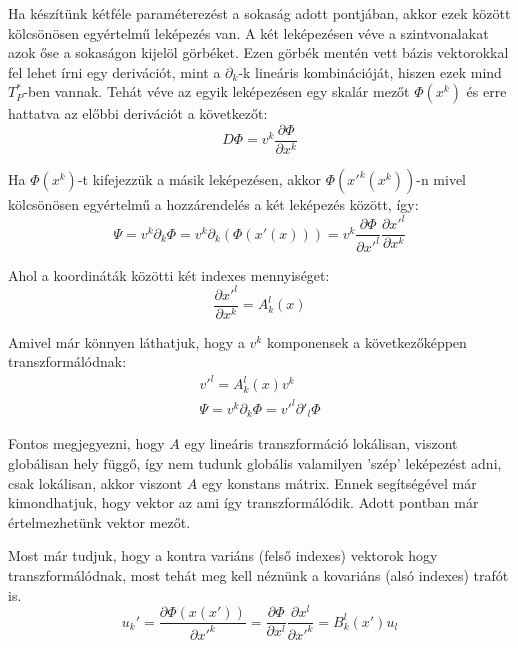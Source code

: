 \documentclass[a4paper, 12pt]{article}
\begin{document}
\par Ha készítünk kétféle paraméterezést a sokaság adott pontjában, akkor ezek között kölcsönösen egyértelmű leképezés van. A két leképezésen véve a szintvonalakat azok őse a sokaságon kijelöl görbéket. Ezen görbék mentén vett bázis vektorokkal fel lehet írni egy derivációt, mint a $\partial_{k}$-k lineáris kombinációját, hiszen ezek mind $T^{*}_{P}$-ben vannak. Tehát véve az egyik leképezésen egy skalár mezőt $\Phi(x^{k})$ és erre hattatva az előbbi derivációt a következőt:
\begin{equation*}
    D\Phi = v^{k}\frac{\partial\Phi}{\partial x^{k}}
\end{equation*}
\par Ha $\Phi(x^{k})$-t kifejezzük a másik leképezésen, akkor $\Phi(x'^{k}(x^{k}))$-n mivel kölcsönösen egyértelmű a hozzárendelés a két leképezés között, így:
\begin{equation*}
    \Psi = v^{k}\partial_{k}\Phi = v^{k}\partial_{k}(\Phi(x'(x))) = v^{k}\frac{\partial\Phi}{\partial x'^{l}}\frac{\partial x'^{l}}{\partial x^{k}}
\end{equation*}
\par Ahol a koordináták közötti két indexes mennyiséget:
\begin{equation*}
    \frac{\partial x'^{l}}{\partial x^{k}} = A^{l}_{k}(x)
\end{equation*}
\par Amivel már könnyen láthatjuk, hogy a $v^{k}$ komponensek a következőképpen transzformálódnak:
\begin{gather*}
    v'^{l} = A^{l}_{k}(x)v^{k} \\
    \Psi = v^{k}\partial_{k}\Phi = v'^{l}\partial'_{l}\Phi
\end{gather*}
\par Fontos megjegyezni, hogy $A$ egy lineáris transzformáció lokálisan, viszont globálisan hely függő, így nem tudunk globális valamilyen 'szép' leképezést adni, csak lokálisan, akkor viszont $A$ egy konstans mátrix. Ennek segítségével már kimondhatjuk, hogy vektor az ami így transzformálódik. Adott pontban már értelmezhetünk vektor mezőt. 
\par Most már tudjuk, hogy a kontra variáns (felső indexes) vektorok hogy transzformálódnak, most tehát meg kell néznünk a kovariáns (alsó indexes) trafót is.
\begin{equation*}
    u_{k}' = \frac{\partial\Phi(x(x'))}{\partial x'^{k}} = \frac{\partial\Phi}{\partial x^{l}}\frac{\partial x^{l}}{\partial x'^{k}} = B_{k}^{l}(x')u_{l}
\end{equation*}
\end{document}
